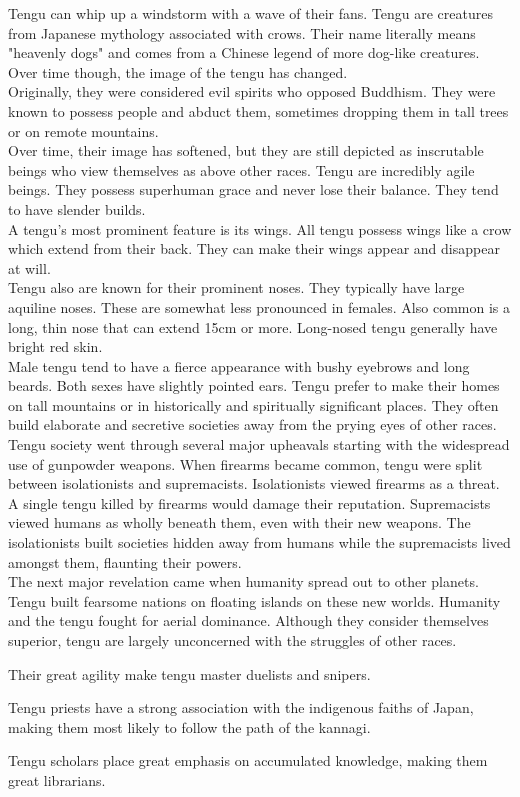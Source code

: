 ﻿
{Tengu can whip up a windstorm with a wave of their fans.}
{}
{Tengu are creatures from Japanese mythology associated with crows. Their name literally means "heavenly dogs" and comes from a Chinese legend of more dog-like creatures. Over time though, the image of the tengu has changed.\\
Originally, they were considered evil spirits who opposed Buddhism. They were known to possess people and abduct them, sometimes dropping them in tall trees or on remote mountains.\\
Over time, their image has softened, but they are still depicted as inscrutable beings who view themselves as above other races.}
{Tengu are incredibly agile beings. They possess superhuman grace and never lose their balance. They tend to have slender builds.\\
A tengu's most prominent feature is its wings. All tengu possess wings like a crow which extend from their back. They can make their wings appear and disappear at will.\\
Tengu also are known for their prominent noses. They typically have large aquiline noses. These are somewhat less pronounced in females. Also common is a long, thin nose that can extend 15cm or more. Long-nosed tengu generally have bright red skin.\\
Male tengu tend to have a fierce appearance with bushy eyebrows and long beards. Both sexes have slightly pointed ears.}
{Tengu prefer to make their homes on tall mountains or in historically and spiritually significant places. They often build elaborate and secretive societies away from the prying eyes of other races.}
{Tengu society went through several major upheavals starting with the widespread use of gunpowder weapons. When firearms became common, tengu were split between isolationists and supremacists. Isolationists viewed firearms as a threat. A single tengu killed by firearms would damage their reputation. Supremacists viewed humans as wholly beneath them, even with their new weapons. The isolationists built societies hidden away from humans while the supremacists lived amongst them, flaunting their powers.\\
The next major revelation came when humanity spread out to other planets. Tengu built fearsome nations on floating islands on these new worlds. Humanity and the tengu fought for aerial dominance. Although they consider themselves superior, tengu are largely unconcerned with the struggles of other races.}
{
\item Their great agility make tengu master duelists and snipers.
\item Tengu priests have a strong association with the indigenous faiths of Japan, making them most likely to follow the path of the kannagi.
\item Tengu scholars place great emphasis on accumulated knowledge, making them great librarians.}
